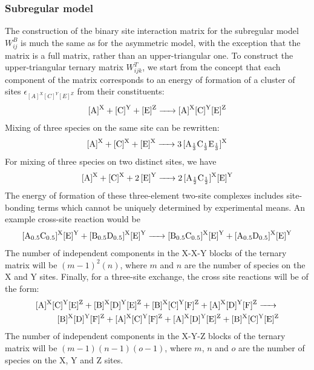 \documentclass[preprint,12pt]{elsarticle}
\begin{document}
\subsubsection{Subregular model}
The construction of the binary site interaction matrix for the subregular model $W^B_{ij}$ is much the same as for the asymmetric model, with the exception that the matrix is a full matrix, rather than an upper-triangular one. To construct the upper-triangular ternary matrix $W^T_{ijk}$, we start from the concept that each component of the matrix corresponds to an energy of formation of a cluster of sites $\epsilon_{[A]^X[C]^Y[E]^Z}$ from their constituents:
\begin{equation}
    \ce{[A]^X + [C]^Y + [E]^Z -> [A]^X[C]^Y[E]^Z}
\end{equation}
Mixing of three species on the same site can be rewritten:
\begin{equation}
    \ce{[A]^X + [C]^X + [E]^X -> 3[A_{\frac{1}{3}}C_{\frac{1}{3}}E_{\frac{1}{3}}]^X}
\end{equation}
For mixing of three species on two distinct sites, we have
\begin{equation}
    \ce{[A]^X + [C]^X + 2[E]^Y -> 2[A_{\frac{1}{2}}C_{\frac{1}{2}}]^X[E]^Y}
\end{equation}
The energy of formation of these three-element two-site complexes includes site-bonding terms which cannot be uniquely determined by experimental means. An example cross-site reaction would be
\begin{equation}
    \ce{[A_{0.5}C_{0.5}]^X[E]^Y + [B_{0.5}D_{0.5}]^X[E]^Y -> [B_{0.5}C_{0.5}]^X[E]^Y + [A_{0.5}D_{0.5}]^X[E]^Y}
\end{equation}
The number of independent components in the X-X-Y blocks of the ternary matrix will be $(m-1)^2(n)$, where $m$ and $n$ are the number of species on the X and Y sites. Finally, for a three-site exchange, the cross site reactions will be of the form:
\begin{equation}
\begin{split}
    \ce{[A]^X[C]^Y[E]^Z + [B]^X[D]^Y[E]^Z + [B]^X[C]^Y[F]^Z + [A]^X[D]^Y[F]^Z -> \\
    [B]^X[D]^Y[F]^Z + [A]^X[C]^Y[F]^Z + [A]^X[D]^Y[E]^Z + [B]^X[C]^Y[E]^Z}
\end{split}
\end{equation}
The number of independent components in the X-Y-Z blocks of the ternary matrix will be $(m-1)(n-1)(o-1)$, where $m$, $n$ and $o$ are the number of species on the X, Y and Z sites.
\end{document}
